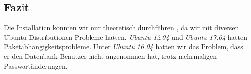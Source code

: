\subsection{Fazit}
Die Installation konnten wir nur theoretisch durchführen \cite{owncloud:install}, da wir mit diversen Ubuntu Distributionen Probleme hatten. \textit{Ubuntu 12.04} und \textit{Ubuntu 17.04} hatten Paketabhängigkeitsprobleme. Unter \textit{Ubuntu 16.04} hatten wir das Problem, dass er den Datenbank-Benutzer nicht angenommen hat, trotz mehrmaligen Passwortänderungen.